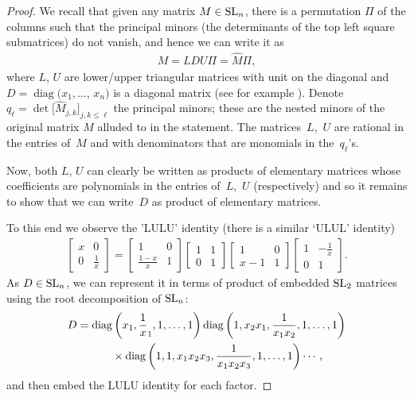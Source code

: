 \documentclass[pdftex]{sigma}
\numberwithin{equation}{section}
\def\wh{\widehat}
\begin{document}
\begin{proof}
We recall that given any matrix $M\in {\rm SL}_n$, there is a permutation $\Pi$ of the columns such that the principal minors (the determinants of the top left square submatrices) do not vanish, and hence we can write it as
\begin{gather*}
M = L D U \Pi = \wh M\Pi,
\end{gather*}
where $L$, $U$ are lower/upper triangular matrices with unit on the diagonal and $D = \operatorname{diag}(x_1,\dots$, $x_n)$ is a diagonal matrix (see for example \cite[Vol.~1, Chapter~II]{Gantmacher}). Denote $q_\ell = \det \big[\wh M_{j,k}\big]_{j,k\leq \ell}$ the principal minors; these are the nested minors of the original matrix $M$ alluded to in the statement. The matrices~$L$,~$U$ are rational in the entries of~$M$ and with denominators that are monomials in the~$q_\ell$'s.

Now, both $L$, $U$ can clearly be written as products of elementary matrices whose coef\/f\/icients are polynomials in the entries of~$L$,~$U$ (respectively) and so it remains to show that we can write~$D$ as product of elementary matrices.

To this end we observe the 'LULU' identity (there is a similar `ULUL' identity)
\begin{gather*}
\left[
\begin{matrix}
x & 0\\
0 &\frac 1 x
\end{matrix}
\right] =
\left[
\begin{matrix}
1 & 0\\
\frac {1-x}x & 1
\end{matrix}
\right]
\left[
\begin{matrix}
1 & 1\\
0 & 1
\end{matrix}
\right]
\left[
\begin{matrix}
1 & 0\\
x-1 & 1
\end{matrix}
\right]
\left[
\begin{matrix}
1 & -\frac 1 x \\
0 & 1
\end{matrix}
\right].
\end{gather*}
As $D\in {\rm SL}_n$, we can represent it in terms of product of embedded ${\rm SL}_2$ matrices using the root decomposition of ${\rm SL}_n$:
\begin{gather*}
D = \operatorname{diag}\left(x_1,\frac 1 x_1,1,\dots,1\right)
\operatorname{diag}\left(1,x_2 x_1, \frac 1{x_1 x_2},1,\dots,1\right)\\
\hphantom{D =}{}\times
\operatorname{diag}\left(1,1, x_1x_2x_3, \frac 1{x_1 x_2x_3},1,\dots,1\right) \cdots,
\end{gather*}
and then embed the LULU identity for each factor.


\end{proof}
\end{document}
